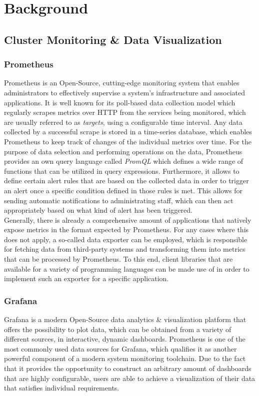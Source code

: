 \chapter{Background}\label{chapter:background}

\section{Cluster Monitoring \& Data Visualization}

\subsection{Prometheus}
Prometheus is an Open-Source, cutting-edge monitoring system that enables administrators to effectively supervise a system's infrastructure and associated applications. It is well known for its poll-based data collection model which regularly scrapes metrics over HTTP from the services being monitored, which are usually referred to as \textit{targets}, using a configurable time interval. Any data collected by a successful scrape is stored in a time-series database, which enables Prometheus to keep track of changes of the individual metrics over time. For the purpose of data selection and performing operations on the data, Prometheus provides an own query language called \textit{PromQL} which defines a wide range of functions that can be utilized in query expressions. Furthermore, it allows to define certain alert rules that are based on the collected data in order to trigger an alert once a specific condition defined in those rules is met. This allows for sending automatic notifications to administrating staff, which can then act appropriately based on what kind of alert has been triggered.\\
Generally, there is already a comprehensive amount of applications that natively expose metrics in the format expected by Prometheus. For any cases where this does not apply, a so-called data exporter can be employed, which is responsible for fetching data from third-party systems and transforming them into metrics that can be processed by Prometheus. To this end, client libraries that are available for a variety of programming languages can be made use of in order to implement such an exporter for a specific application.


\subsection{Grafana}
Grafana is a modern Open-Source data analytics \& visualization platform that offers the possibility to plot data, which can be obtained from a variety of different sources, in interactive, dynamic dashboards. Prometheus is one of the most commonly used data sources for Grafana, which qualifies it as another powerful component of a modern system monitoring toolchain. Due to the fact that it provides the opportunity to construct an arbitrary amount of dashboards that are highly configurable, users are able to achieve a visualization of their data that satisfies individual requirements.


